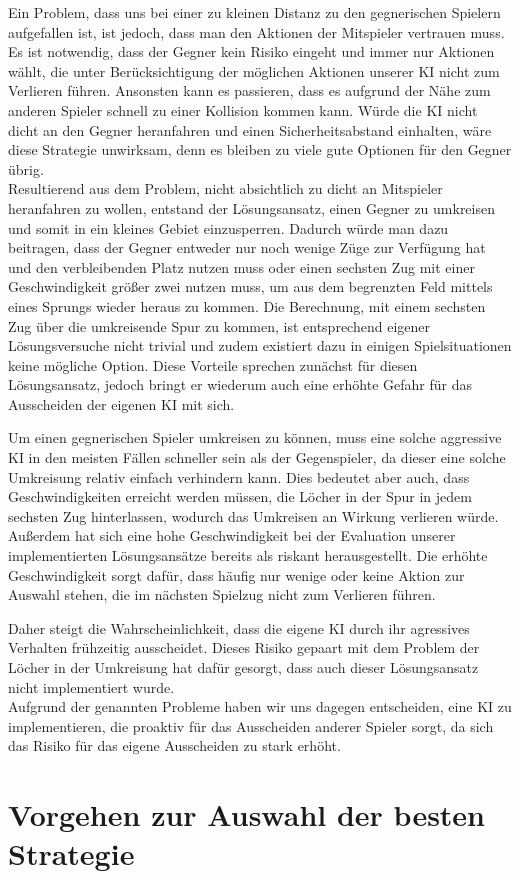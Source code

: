 Ein Problem, dass uns bei einer zu kleinen Distanz zu den gegnerischen Spielern aufgefallen ist, ist jedoch, dass man
den Aktionen der Mitspieler vertrauen muss.
Es ist notwendig, dass der Gegner kein Risiko eingeht und immer nur Aktionen wählt, die unter Berücksichtigung der
möglichen Aktionen unserer \ac{KI} nicht zum Verlieren führen.
Ansonsten kann es passieren, dass es aufgrund der Nähe zum anderen Spieler schnell zu einer Kollision kommen kann.
Würde die \ac{KI} nicht dicht an den Gegner heranfahren und einen Sicherheitsabstand einhalten, wäre diese Strategie
unwirksam, denn es bleiben zu viele gute Optionen für den Gegner übrig. \\

Resultierend aus dem Problem, nicht absichtlich zu dicht an Mitspieler heranfahren zu wollen, entstand der
Lösungsansatz, einen Gegner zu umkreisen und somit in ein kleines Gebiet einzusperren.
Dadurch würde man dazu beitragen, dass der Gegner entweder nur noch wenige Züge zur Verfügung hat und den verbleibenden
Platz nutzen muss oder einen sechsten Zug mit einer Geschwindigkeit größer zwei nutzen muss, um aus dem begrenzten Feld
mittels eines Sprungs wieder heraus zu kommen.
Die Berechnung, mit einem sechsten Zug über die umkreisende Spur zu kommen, ist entsprechend eigener Lösungsversuche
nicht trivial und zudem existiert dazu in einigen Spielsituationen keine mögliche Option.
Diese Vorteile sprechen zunächst für diesen Lösungsansatz, jedoch bringt er wiederum auch eine erhöhte Gefahr für das
Ausscheiden der eigenen \ac{KI} mit sich.

Um einen gegnerischen Spieler umkreisen zu können, muss eine solche aggressive \ac{KI} in den meisten Fällen schneller
sein als der Gegenspieler, da dieser eine solche Umkreisung relativ einfach verhindern kann.
Dies bedeutet aber auch, dass Geschwindigkeiten erreicht werden müssen, die Löcher in der Spur in jedem sechsten Zug
hinterlassen, wodurch das Umkreisen an Wirkung verlieren würde.
Außerdem hat sich eine hohe Geschwindigkeit bei der Evaluation unserer implementierten Lösungsansätze bereits als
riskant herausgestellt. 
Die erhöhte Geschwindigkeit sorgt dafür, dass häufig nur wenige oder keine Aktion zur Auswahl stehen, die im
nächsten Spielzug nicht zum Verlieren führen.

Daher steigt die Wahrscheinlichkeit, dass die eigene \ac{KI} durch ihr agressives Verhalten frühzeitig ausscheidet.
Dieses Risiko gepaart mit dem Problem der Löcher in der Umkreisung hat dafür gesorgt, dass auch dieser Lösungsansatz
nicht implementiert wurde. \\

Aufgrund der genannten Probleme haben wir uns dagegen entscheiden, eine \ac{KI} zu implementieren, die proaktiv für das
Ausscheiden anderer Spieler sorgt, da sich das Risiko für das eigene Ausscheiden zu stark erhöht.

\section{Vorgehen zur Auswahl der besten Strategie}
\label{sec:vorgehen-strategieauswahl}

